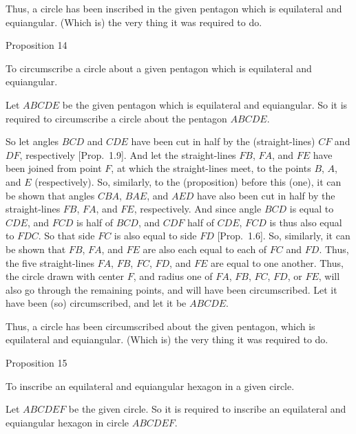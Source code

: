  Thus, a circle has been inscribed in the given pentagon which is
 equilateral and equiangular. (Which is) the very thing it was required to
 do.


\begin{center}
{\large Proposition 14}
\end{center}

To circumscribe a circle about a given pentagon which is equilateral and equiangular.

Let $ABCDE$ be the given pentagon  which is equilateral and equiangular.
So it is required to circumscribe a circle about the pentagon 
$ABCDE$.

\epsfysize=2.2in
\centerline{}

So let angles $BCD$ and $CDE$ have  been cut
in half by  the (straight-lines) $CF$ and $DF$, respectively [Prop.~1.9]. And let the straight-lines
$FB$, $FA$, and $FE$ have been joined from point $F$, at which the
straight-lines meet, to the points $B$, $A$, and $E$ (respectively).
So, similarly, to the (proposition) before this (one), it can be shown that
angles $CBA$, $BAE$, and $AED$ have also  been cut in half by
the straight-lines $FB$, $FA$, and $FE$, respectively. And since
angle $BCD$ is equal to $CDE$, and $FCD$ is half of $BCD$, and $CDF$ half
of $CDE$, $FCD$ is thus also equal to $FDC$. So that side $FC$ is also equal to
side $FD$ [Prop.~1.6]. So, similarly, it can be
shown that $FB$, $FA$, and $FE$ are also each equal to each of $FC$ and $FD$. 
Thus, the five straight-lines $FA$, $FB$, $FC$, $FD$, and $FE$ are equal to
one another. Thus, the circle drawn with center $F$, and radius one of
$FA$, $FB$, $FC$, $FD$, or $FE$, will also go through the remaining points, and
will have been circumscribed. Let it have been (so) circumscribed, and let
it be $ABCDE$.

Thus, a circle has been circumscribed about the given pentagon, which
is equilateral and equiangular. (Which is) the very thing it was required to
do.


\begin{center}
{\large Proposition 15}
\end{center}

To inscribe an equilateral and equiangular hexagon
in a given circle.

Let $ABCDEF$ be the given circle. So it is required to inscribe an equilateral
and equiangular hexagon in circle $ABCDEF$.

